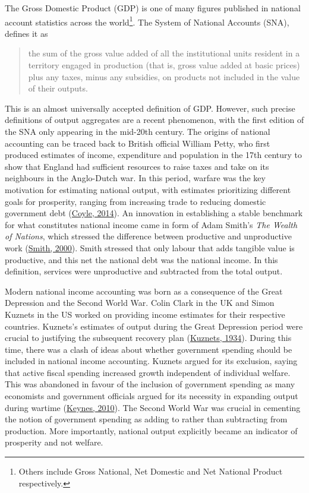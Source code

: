 \documentclass[12pt,nobind, a4paper]{reedthesis}
\begin{document}
 The Gross Domestic Product (GDP) is one of many figures published in national account statistics across the world\footnote{Others include Gross National, Net Domestic and Net National Product respectively.}. The System of National Accounts (SNA), defines it as
 \begin{quote}
 the sum of the gross value added of all the institutional units resident in a territory engaged in production (that is, gross value added at basic prices) plus any taxes, minus any subsidies, on products not included in the value of their 
 outputs.
 \end{quote}
 This is an almost universally accepted definition of GDP. However, such precise definitions of output aggregates are a recent phenomenon, with the first edition of the SNA only appearing in the mid-20th century. The origins of national accounting can be traced back to British official William Petty, who first produced estimates of income, expenditure and population in the 17th century to show that England had sufficient resources to raise taxes and take on its neighbours in the Anglo-Dutch war. In this period, warfare was the key motivation for estimating national output, with estimates prioritizing different goals for prosperity, ranging from increasing trade to reducing domestic government debt (\protect\hyperlink{ref-coyle_gdp_2014}{Coyle, 2014}). An innovation in establishing a stable benchmark for what constitutes national income came in form of Adam Smith's \emph{The Wealth of Nations}, which stressed the difference between productive and unproductive work (\protect\hyperlink{ref-smith_wealth_2000}{Smith, 2000}). Smith stressed that only labour that adds tangible value is productive, and this net the national debt was the national income. In this definition, services were unproductive and subtracted from the total output.
 \linebreak

 Modern national income accounting was born as a consequence of the Great Depression and the Second World War. Colin Clark in the UK and Simon Kuznets in the US worked on providing income estimates for their respective countries. Kuznets's estimates of output during the Great Depression period were crucial to justifying the subsequent recovery plan (\protect\hyperlink{ref-kuznets_national_1934}{Kuznets, 1934}). During this time, there was a clash of ideas about whether government spending should be included in national income accounting. Kuznets argued for its exclusion, saying that active fiscal spending increased growth independent of individual welfare. This was abandoned in favour of the inclusion of government spending as many economists and government officials argued for its necessity in expanding output during wartime (\protect\hyperlink{ref-keynes_how_2010}{Keynes, 2010}). The Second World War was crucial in cementing the notion of government spending as adding to rather than subtracting from production. More importantly, national output explicitly became an indicator of prosperity and not welfare.
 \linebreak
\end{document}
